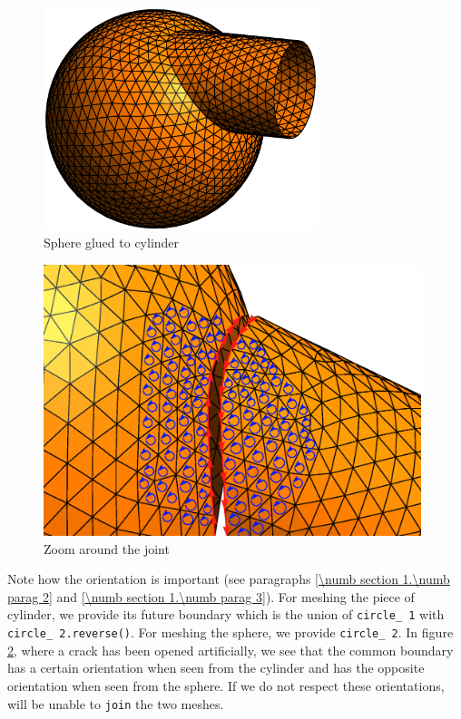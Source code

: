 \begin{figure} \centering
 \includegraphics[width=80mm]{sphere-cyl}
  \caption{Sphere glued to cylinder}
  \label{\numb section 3.\numb fig 5}
\end{figure}

\begin{figure} \centering
 \includegraphics[width=110mm]{crack}
  \caption{Zoom around the joint}
  \label{\numb section 3.\numb fig 6}
\end{figure}

Note how the orientation is important (see paragraphs \ref{\numb section 1.\numb parag 2}
and \ref{\numb section 1.\numb parag 3}).
For meshing the piece of cylinder, we provide its future boundary which is the union of
{\small\tt circle\_\,1} with {\small\tt circle\_\,2.reverse()}.
For meshing the sphere, we provide {\small\tt circle\_\,2}.
In figure \ref{\numb section 3.\numb fig 6}, where a crack has been opened artificially,
we see that the common boundary has a certain orientation when seen from the cylinder and
has the opposite orientation when seen from the sphere.
If we do not respect these orientations, {\maniFEM} will be unable to {\small\tt join} the two
meshes.

